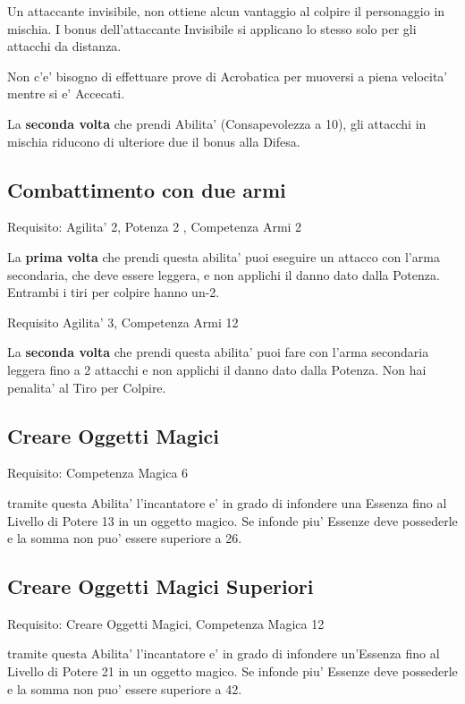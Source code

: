 \documentclass[a4paper,11pt,twoside,openany]{book}
\begin{document}
	Un attaccante invisibile, non ottiene alcun vantaggio al colpire il personaggio in mischia. I bonus dell'attaccante Invisibile si applicano lo stesso solo per gli attacchi da distanza.
	
	Non c'e' bisogno di effettuare prove di Acrobatica per muoversi a piena velocita' mentre si e' Accecati.
	
	La \textbf{seconda volta} che prendi Abilita' (Consapevolezza a 10), gli attacchi in mischia riducono di ulteriore due il bonus alla Difesa.
	
	\subsection{Combattimento con due armi}
	
	Requisito: Agilita' 2, Potenza 2 , Competenza Armi 2
	
	La \textbf{prima volta} che prendi questa abilita' puoi eseguire un attacco con l'arma secondaria, che deve essere leggera, e non applichi il danno dato dalla Potenza. Entrambi i tiri per colpire hanno un-2.
	
	Requisito Agilita' 3, Competenza Armi 12
	
	La \textbf{seconda volta} che prendi questa abilita' puoi fare con l'arma secondaria leggera fino a 2 attacchi e non applichi il danno dato dalla Potenza. Non hai penalita' al Tiro per Colpire.
	
	\subsection{Creare Oggetti Magici}
	
	Requisito: Competenza Magica 6
	
	tramite questa Abilita' l'incantatore e' in grado di infondere una Essenza fino al Livello di Potere 13 in un oggetto magico. Se infonde piu' Essenze deve possederle e la somma non puo' essere superiore a 26.
	
	\subsection{Creare Oggetti Magici Superiori}
	
	Requisito: Creare Oggetti Magici, Competenza Magica 12
	
	tramite questa Abilita' l'incantatore e' in grado di infondere un'Essenza fino al Livello di Potere 21 in un oggetto magico. Se infonde piu' Essenze deve possederle e la somma non puo' essere superiore a 42.
	
\end{document}
